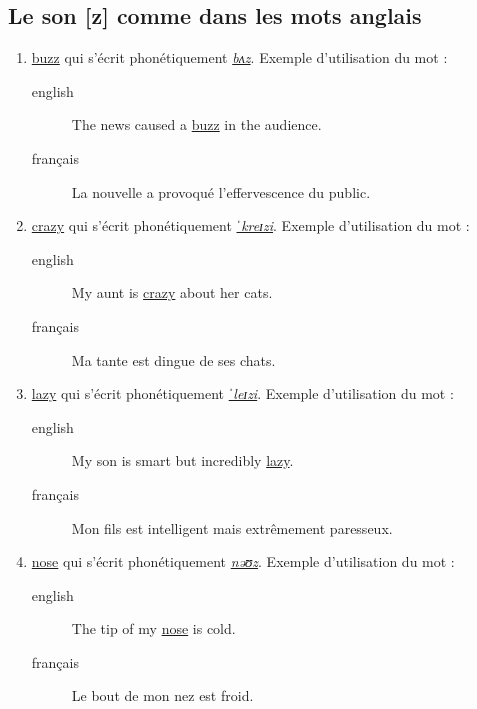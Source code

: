 \subsection{Le son [z] comme dans les mots anglais}
\label{sec:orgeeffa49}
\begin{enumerate}
\item \href{http://www.wordreference.com/enfr/buzz}{buzz} qui s'écrit phonétiquement \href{https://en.oxforddictionaries.com/definition/buzz}{\emph{bʌz}}. Exemple d'utilisation du mot :
\begin{description}
\item[{english}] \textenglish{The news caused a \href{https://youtu.be/OoQJUNv-Jlg}{buzz} in the audience.}
\item[{français}] La nouvelle a provoqué l'effervescence du public.
\end{description}
\item \href{http://www.wordreference.com/enfr/crazy}{crazy} qui s'écrit phonétiquement \href{https://en.oxforddictionaries.com/definition/crazy}{\emph{ˈkreɪzi}}. Exemple d'utilisation du mot :
\begin{description}
\item[{english}] \textenglish{My aunt is \href{https://youtu.be/U0EW0s1fN-8}{crazy} about her cats.}
\item[{français}] Ma tante est dingue de ses chats.
\end{description}
\item \href{http://www.wordreference.com/enfr/lazy}{lazy} qui s'écrit phonétiquement \href{https://en.oxforddictionaries.com/definition/lazy}{\emph{ˈleɪzi}}. Exemple d'utilisation du mot :
\begin{description}
\item[{english}] \textenglish{My son is smart but incredibly \href{https://youtu.be/3ev7GXzFTPg}{lazy}.}
\item[{français}] Mon fils est intelligent mais extrêmement paresseux.
\end{description}
\item \href{http://www.wordreference.com/enfr/nose}{nose} qui s'écrit phonétiquement \href{https://en.oxforddictionaries.com/definition/nose}{\emph{nəʊz}}. Exemple d'utilisation du mot :
\begin{description}
\item[{english}] \textenglish{The tip of my \href{https://youtu.be/1G-nn-b4TJA}{nose} is cold.}
\item[{français}] Le bout de mon nez est froid.
\end{description}
\end{enumerate}
